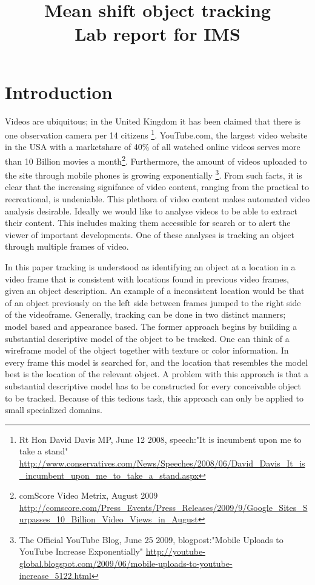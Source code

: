 \documentclass[a4paper,11pt]{article}
\title{Mean shift object tracking\\ Lab report for IMS}
\date{}
\begin{document}
\maketitle 

\section{Introduction}
	Videos are ubiquitous; in the United Kingdom it has been claimed that there is one observation camera per 14 citizens \footnote{
Rt Hon David Davis MP, June 12 2008, speech:"It is incumbent upon me to take a stand" 
\url{http://www.conservatives.com/News/Speeches/2008/06/David_Davis_It_is_incumbent_upon_me_to_take_a_stand.aspx}
}. YouTube.com, the largest video website in the USA with a marketshare of 40\% of all watched online videos serves more than 10 Billion movies a month\footnote{comScore Video Metrix, August 2009 
\url{http://comscore.com/Press_Events/Press_Releases/2009/9/Google_Sites_Surpasses_10_Billion_Video_Views_in_August}}.
	Furthermore, the amount of videos uploaded to the site through mobile phones is growing exponentially \footnote{The Official YouTube Blog, June 25 2009, blogpost:"Mobile Uploads to YouTube Increase Exponentially" 
\url{http://youtube-global.blogspot.com/2009/06/mobile-uploads-to-youtube-increase_5122.html}}. 
	From such facts, it is clear that the increasing signifance of video content, ranging from the practical to recreational, is undeniable. This plethora of video content makes automated video analysis desirable. Ideally we would like to analyse videos to be able to extract their content. This includes making them accessible for search or to alert the viewer of important developments. One of these analyses is tracking an object through multiple frames of video.

In this paper tracking is understood as identifying an object at a location in a video frame that is consistent with locations found in previous video frames, given an object description. An example of a inconsistent location would be that of an object previously on the left side between frames jumped to the right side of the videoframe. Generally, tracking can be done in two distinct manners; model based and appearance based. 
The former approach begins by building a substantial descriptive model of the object to be tracked. One can think of a wireframe model of the object together with texture or color information. In every frame this model is searched for, and the location that resembles the model best is the location of the relevant object.  A problem with this approach is that a substantial descriptive model has to be constructed for every conceivable object to be tracked.  Because of this tedious task, this approach can only be applied to small specialized domains.  
\end{document}
